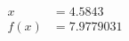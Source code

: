 \documentclass[preview]{standalone}
\begin{document}
\begin{align*}
x &= 4.5843\\f(x) &= 7.9779031
\end{align*}
\end{document}
